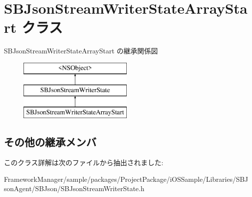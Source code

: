 \hypertarget{interface_s_b_json_stream_writer_state_array_start}{}\section{S\+B\+Json\+Stream\+Writer\+State\+Array\+Start クラス}
\label{interface_s_b_json_stream_writer_state_array_start}
S\+B\+Json\+Stream\+Writer\+State\+Array\+Start の継承関係図\begin{figure}[H]
\begin{center}
\leavevmode
\includegraphics[height=3.000000cm]{interface_s_b_json_stream_writer_state_array_start}
\end{center}
\end{figure}
\subsection*{その他の継承メンバ}


このクラス詳解は次のファイルから抽出されました\+:\begin{DoxyCompactItemize}
\item 
Framework\+Manager/sample/packages/\+Project\+Package/i\+O\+S\+Sample/\+Libraries/\+S\+B\+Json\+Agent/\+S\+B\+Json/S\+B\+Json\+Stream\+Writer\+State.\+h\end{DoxyCompactItemize}
